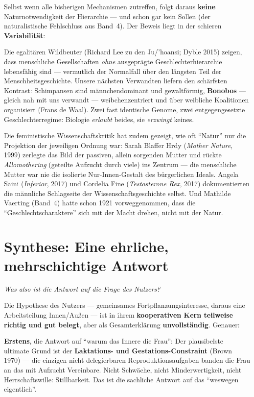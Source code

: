 \documentclass[11pt,a4paper,ngerman]{scrartcl}
\newcommand{\chipbase}[2]{\hspace{0pt}{\footnotesize\textcolor{#1}{[\textsc{#2}]}}}
\newcommand{\chipbelegt}[1]{\chipbase{chipgreen}{#1}}
\newcommand{\chipplausibel}[1]{\chipbase{chipamber}{#1}}
\begin{document}
Selbst wenn alle bisherigen Mechanismen zutreffen, folgt daraus \textbf{keine} Naturnotwendigkeit der Hierarchie --- und schon gar kein Sollen (der naturalistische Fehlschluss aus Band~4). Der Beweis liegt in der schieren \textbf{Variabilität}:

Die egalitären Wildbeuter (Richard Lee zu den Ju/'hoansi; Dyble 2015) zeigen, dass menschliche Gesellschaften \emph{ohne} ausgeprägte Geschlechterhierarchie lebensfähig sind --- vermutlich der Normalfall über den längsten Teil der Menschheitsgeschichte. \chipplausibel{plausibel} Unsere nächsten Verwandten liefern den schärfsten Kontrast: Schimpansen sind männchendominant und gewaltförmig, \textbf{Bonobos} --- gleich nah mit uns verwandt --- weibchenzentriert und über weibliche Koalitionen organisiert (Frans de Waal). Zwei fast identische Genome, zwei entgegengesetzte Geschlechterregime: Biologie \emph{erlaubt} beides, sie \emph{erzwingt} keines. \chipbelegt{belegt}

Die feministische Wissenschaftskritik hat zudem gezeigt, wie oft \enquote{Natur} nur die Projektion der jeweiligen Ordnung war: Sarah Blaffer Hrdy (\emph{Mother Nature}, 1999) zerlegte das Bild der passiven, allein sorgenden Mutter und rückte \emph{Allomothering} (geteilte Aufzucht durch viele) ins Zentrum --- die menschliche Mutter war nie die isolierte Nur-Innen-Gestalt des bürgerlichen Ideals. Angela Saini (\emph{Inferior}, 2017) und Cordelia Fine (\emph{Testosterone Rex}, 2017) dokumentierten die männliche Schlagseite der Wissenschaftsgeschichte selbst. \chipbelegt{belegt} Und Mathilde Vaerting (Band~4) hatte schon 1921 vorweggenommen, dass die \enquote{Geschlechtscharaktere} sich mit der Macht drehen, nicht mit der Natur.

\section{Synthese: Eine ehrliche, mehrschichtige Antwort}
\noindent\textit{Was also ist die Antwort auf die Frage des Nutzers?}
\medskip

Die Hypothese des Nutzers --- gemeinsames Fortpflanzungsinteresse, daraus eine Arbeitsteilung Innen/Außen --- ist in ihrem \textbf{kooperativen Kern teilweise richtig und gut belegt}, aber als Gesamterklärung \textbf{unvollständig}. Genauer:

\textbf{Erstens}, die Antwort auf \enquote{warum das Innere die Frau}: Der plausibelste ultimate Grund ist der \textbf{Laktations- und Gestations-Constraint} (Brown 1970) --- die einzigen nicht delegierbaren Reproduktionsaufgaben banden die Frau an das mit Aufzucht Vereinbare. Nicht Schwäche, nicht Minderwertigkeit, nicht Herrschaftswille: Stillbarkeit. Das ist die sachliche Antwort auf das \enquote{weswegen eigentlich}. \chipplausibel{plausibel}
\end{document}
